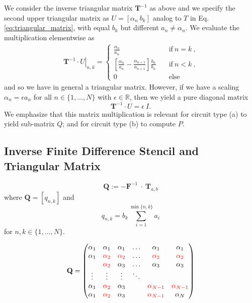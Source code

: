 \documentclass[a4paper, 10pt, twoside, twocolumn]{scrartcl}
\begin{document}
We consider the inverse triangular matrix $\mathbf{T}^{-1}$ as above and we specify the second upper triangular matrix as $U = \left[\alpha_{n}~b_{k}\right]$ analog to $T$ in  Eq. \eqref{eq:triangular_matrix}, with equal $b_{k}$ but different $a_{n} \neq \alpha_{n}$. We evaluate the multiplication elementwise as 
\begin{align}
	\left. \mathbf{T}^{-1} \cdot U \right\lvert_{n,k} = 
	\begin{cases}
		\frac{\alpha_{n}}{a_{n}} \quad &\text{if} ~ n = k ~\text{,}\\[1ex]
		\left[\frac{\alpha_{n}}{a_{n}} - \frac{\alpha_{n+1}}{a_{n+1}} \right] \frac{b_{k}}{b_{n}}\quad &\text{if} ~ n < k ~\text{,}\\[1ex]
		0 \quad &\text{else}
	\end{cases}
\end{align}
and so we have in general a triangular matrix. However, if we have a scaling $\alpha_{n} = \epsilon a_{n}$ for all $n \in \{1,\ldots,N\}$ with $\epsilon \in \mathbb{R}$, then we yield a pure diagonal matrix
\begin{equation*}
	\mathbf{T}^{-1} \cdot U = \epsilon~I \text{.}
\end{equation*}
We emphasize that this matrix multiplication is relevant for circuit type (a) to yield sub-matrix $Q$; and for circuit type (b) to compute $P$.

\subsection*{Inverse Finite Difference Stencil and Triangular Matrix}

\begin{equation}
	\mathbf{Q} := - \mathbf{F}^{-1} ~\cdot~ \mathbf{T}_{a,b}
\end{equation}
where $\mathbf{Q} = [q_{n,k}]$ and 
\begin{equation}
	q_{n,k} = b_{k} \sum_{i=1}^{\min\{n,k\}} a_{i}
\end{equation}
for $n,k \in \{1,\ldots,N\}$.

\begin{equation}
	\mathbf{Q} = 
	\def\aa{\color{red}\alpha_{2}}
	\def\ab{\color{red}\alpha_{N-1}}
	\begin{pmatrix}
		\alpha_{1} & \alpha_{1} & \alpha_{1} & \ldots & \alpha_{1} & \alpha_{1} \\
		\alpha_{1} & \aa & \aa & \ldots & \aa & \aa \\
		     & \aa & \alpha_{3} & \ldots & \alpha_{3} & \alpha_{3} \\
		\vdots     & \vdots & \vdots & \ddots \\
		\alpha_{1}& \aa & \alpha_{3} & & \ab & \ab \\
		\alpha_{1} & \aa & \alpha_{3} & & \ab & \alpha_{N}
	\end{pmatrix}
\end{equation}
\end{document}
